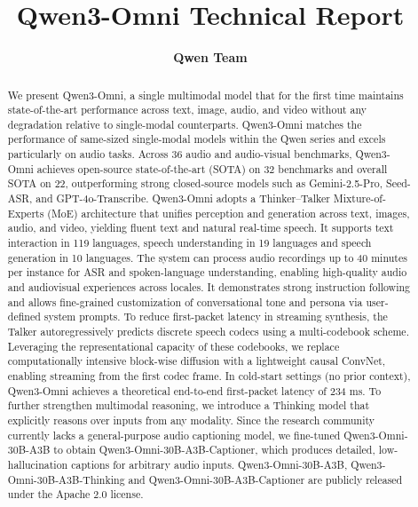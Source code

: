 \documentclass{article} %
\title{Qwen3-Omni Technical Report}
\author{
\bf Qwen Team
}
\begin{document}
\maketitle


\begin{abstract}
We present Qwen3-Omni, a single multimodal model that for the first time maintains state-of-the-art performance across text, image, audio, and video without any degradation relative to single-modal counterparts. Qwen3-Omni matches the performance of same-sized single-modal models within the Qwen series and excels particularly on audio tasks. Across 36 audio and audio-visual benchmarks, Qwen3-Omni achieves open-source state-of-the-art (SOTA) on 32 benchmarks and overall SOTA on 22, outperforming strong closed-source models such as Gemini-2.5-Pro, Seed-ASR, and GPT-4o-Transcribe.
Qwen3-Omni adopts a Thinker–Talker Mixture-of-Experts (MoE) architecture that unifies perception and generation across text, images, audio, and video, yielding fluent text and natural real-time speech. It supports text interaction in 119 languages, speech understanding in 19 languages and speech generation in 10 languages. The system can process audio recordings up to 40 minutes per instance for ASR and spoken-language understanding, enabling high-quality audio and audiovisual experiences across locales. It demonstrates strong instruction following and allows fine-grained customization of conversational tone and persona via user-defined system prompts.
To reduce first-packet latency in streaming synthesis, the Talker autoregressively predicts discrete speech codecs using a multi-codebook scheme. Leveraging the representational capacity of these codebooks, we replace computationally intensive block-wise diffusion with a lightweight causal ConvNet, enabling streaming from the first codec frame. In cold-start settings (no prior context), Qwen3-Omni achieves a theoretical end-to-end first-packet latency of 234 ms. 
To further strengthen multimodal reasoning, we introduce a Thinking model that explicitly reasons over inputs from any modality. Since the research community currently lacks a general-purpose audio captioning model, we fine-tuned Qwen3-Omni-30B-A3B to obtain Qwen3-Omni-30B-A3B-Captioner, which produces detailed, low-hallucination captions for arbitrary audio inputs. Qwen3-Omni-30B-A3B, Qwen3-Omni-30B-A3B-Thinking and Qwen3-Omni-30B-A3B-Captioner are publicly released under the Apache 2.0 license. 


\end{abstract}
\end{document}

